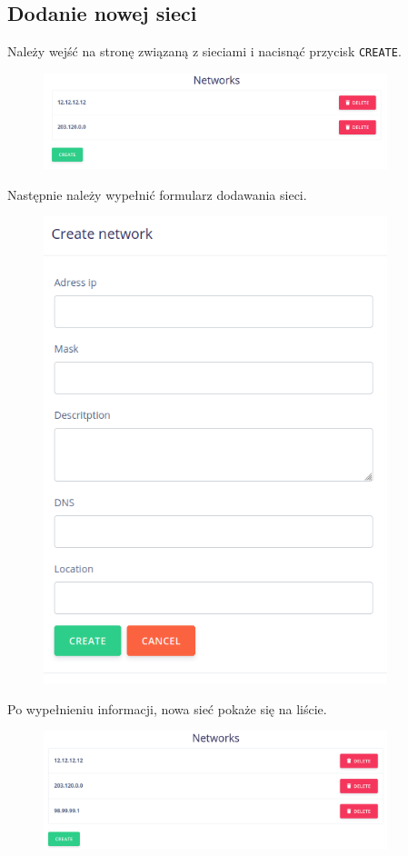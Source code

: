 \documentclass[a4paper,11pt]{article}
\begin{document}
\subsection{Dodanie nowej sieci}
Należy wejść na stronę związaną z sieciami i nacisnąć przycisk \texttt{CREATE}.
\begin{figure}[H]
	\centering
	\includegraphics[width=10cm]{instr01.png}
\end{figure}
Następnie należy wypełnić formularz dodawania sieci.
\begin{figure}[H]
	\centering
	\includegraphics[width=10cm]{instr02.png}
\end{figure}
Po wypełnieniu informacji, nowa sieć pokaże się na liście.
\begin{figure}[H]
	\centering
	\includegraphics[width=10cm]{instr03.png}
\end{figure}
\end{document}

